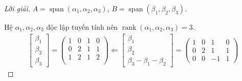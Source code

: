 \begin{proof}[Lời giải]$A = \operatorname{span}(\alpha_{1},\alpha_{2},\alpha_{3})$, $B = \operatorname{span}(\beta_{1},\beta_{2},\beta_{3})$.
    
    Hệ $\alpha_{1}, \alpha_{2}, \alpha_{3}$ độc lập tuyến tính nên $\operatorname{rank}(\alpha_{1}, \alpha_{2}, \alpha_{3}) = 3$.
    \begin{align*}
        \begin{bmatrix}
            \beta_{1} \\
            \beta_{2} \\
            \beta_{3}
        \end{bmatrix}=
        \begin{pmatrix}
            1 & 0 & 1 & 0 \\
            0 & 2 & 1 & 1 \\
            1 & 2 & 1 & 2 \\
        \end{pmatrix}
        \Longleftarrow
        \begin{bmatrix}
            \beta_{1} \\
            \beta_{2} \\
            \beta_{3} - \beta_{1} - \beta_{2}
        \end{bmatrix}=
        \begin{pmatrix}
            1 & 0 & 1  & 0 \\
            0 & 2 & 1  & 1 \\
            0 & 0 & -1 & 1
        \end{pmatrix}
    \end{align*}
    

\end{proof}
